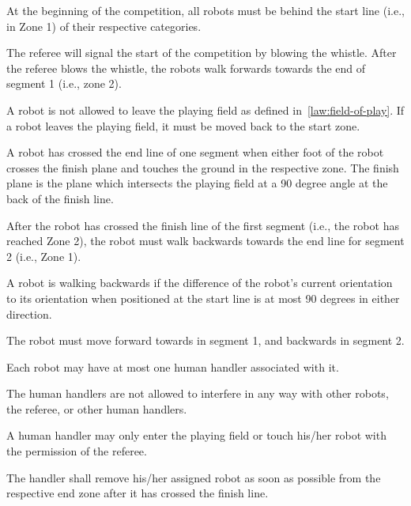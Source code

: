 \documentclass[12pt]{hurocup}
\begin{document}
\begin{lawlist}[RD]
  
\item At the beginning of the competition, all robots must be behind
  the start line (i.e., in Zone 1) of their respective categories.

\item The referee will signal the start of the competition by blowing
  the whistle. After the referee blows the whistle, the robots walk
  forwards towards the end of segment 1 (i.e., zone 2).

\item A robot is not allowed to leave the playing field as defined
  in~\ref{law:field-of-play}.  If a robot leaves the playing field, it
  must be moved back to the start zone.

\item A robot has crossed the end line of one segment when either
  foot of the robot crosses the finish plane and touches the ground in
  the respective zone. The finish plane is the plane which intersects
  the playing field at a 90 degree angle at the back of the finish
  line.
  
\item After the robot has crossed the finish line of the first segment
  (i.e., the robot has reached Zone 2), the robot must walk backwards
  towards the end line for segment 2 (i.e., Zone 1).
  
\item A robot is walking backwards if the difference of the robot's
  current orientation to its orientation when positioned at the start
  line is at most 90 degrees in either direction.
  
\item The robot must move forward towards in segment 1, and backwards
  in segment 2.
  
\item Each robot may have at most one human handler associated with
  it.

\item \label{rd-handler3} The human handlers are not allowed to
  interfere in any way with other robots, the referee, or other human
  handlers.

\item \label{rd-handler4} A human handler may only enter the playing
  field or touch his/her robot with the permission of the referee.

\item The handler shall remove his/her assigned robot as soon as
  possible from the respective end zone after it has crossed the
  finish line.


\end{lawlist}
\end{document}
